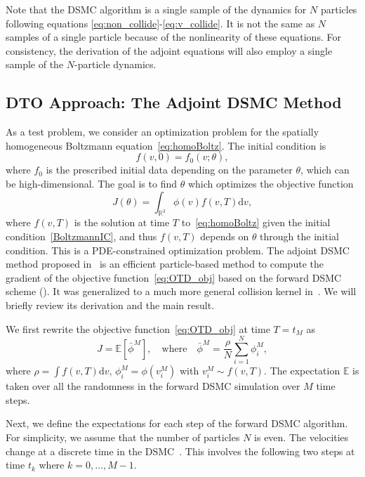 \documentclass[12pt]{amsart}
\newcommand{\bbR}{\mathbb R} \newcommand{\bbS}{\mathbb S}
\newcommand{\rd}{\mathrm{d}}
\begin{document}
Note that the DSMC algorithm is a single sample of the dynamics for $N$ particles following equations \eqref{eq:non_collide}-\eqref{eq:v_collide}. It is not the same as $N$ samples of a single particle because of the nonlinearity of these equations. For consistency, the derivation of the adjoint equations will also employ a single sample of the $N$-particle dynamics.


\subsection{DTO Approach: The Adjoint DSMC Method }\label{subsec:adjoint_DSMC}
As a test problem, we consider an optimization problem for the spatially homogeneous Boltzmann equation~\eqref{eq:homoBoltz}. 
The initial condition is
\begin{equation}
f(v,0)=f_0(v;\theta), \label{BoltzmannIC}
\end{equation}
where $f_0$ is the prescribed initial data depending on the parameter $\theta$, which can be high-dimensional. The goal is to find $\theta$ which optimizes the objective function
\begin{equation}\label{eq:OTD_obj}
J (\theta) = \int_{\bbR^3} \phi (v) f(v,T) \rd v,
\end{equation}
where $f(v,T)$ is the solution at time $T$ to~\eqref{eq:homoBoltz} given the initial condition~\eqref{BoltzmannIC}, and thus $f(v,T)$ depends on $\theta$ through the initial condition. This is a PDE-constrained optimization problem. The adjoint DSMC method proposed in~\cite{caflisch2021adjoint} is an efficient particle-based method to compute the gradient of the objective function~\eqref{eq:OTD_obj} based on the forward DSMC scheme (). It was generalized to a much more general collision kernel in~\cite{yang2023adjoint}. We will briefly review its derivation and the main result.

We first rewrite the objective function~\eqref{eq:OTD_obj} at time $T= t_M$ as
\begin{equation} \label{eq:obj1}
J = \mathbb{E}\left[ \bar{\phi}^M \right],\quad \text{where} \quad 
\bar{\phi}^M = \frac{\rho}{N}\sum_{i=1}^{N} \phi_i^M,
\end{equation}
where $\rho = \int f(v,T) \rd v$, $\phi_i^M=\phi(v_i^M)$ with $v_i^M \sim f(v,T)$. The expectation $\mathbb{E}$ is taken over all the randomness in the forward DSMC simulation over $M$ time steps.


Next, we define the expectations for each step of the forward DSMC algorithm. For simplicity, we assume that the number of particles $N$ is even. The velocities change at a discrete time in the DSMC~. This involves the following two steps at time $t_k$ where $k=0,\ldots,M-1$.
\end{document}
